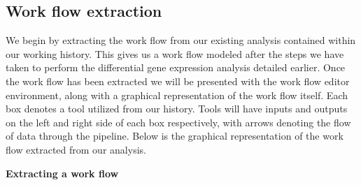 \documentclass[a4paper,10pt]{article}
\begin{document}
\subsection{Work flow extraction}
We begin by extracting the work flow from our existing analysis contained within our working history.  This gives us a work flow modeled after the steps we have taken to perform the differential gene expression analysis detailed earlier.  Once the work flow has been extracted we will be presented with the work flow editor environment, along with a graphical representation of the work flow itself.  Each box denotes a tool utilized from our history.  Tools will have inputs and outputs on the left and right side of each box respectively, with arrows denoting the flow of data through the pipeline.  Below is the graphical representation of the work flow extracted from our analysis.

\noindent\textbf{Extracting a work flow}\vspace{1em}\\
\setlength\fboxsep{0pt}
\end{document}
